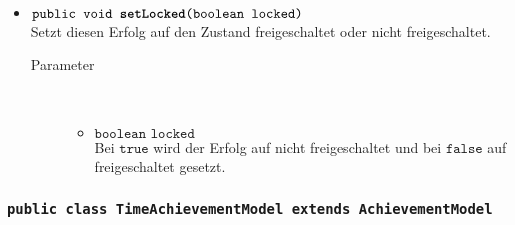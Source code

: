 \begin{description}
\begin{itemize}
	\item $\texttt{public void \textbf{setLocked}(boolean locked)}$ \\ Setzt diesen Erfolg auf den Zustand freigeschaltet oder nicht freigeschaltet.
		\begin{description}
			\item[Parameter] \hfill \\
			\vspace{-.8cm}
			\begin{itemize}
				\item $\texttt{boolean locked}$ \\ Bei $\texttt{true}$ wird der Erfolg auf nicht freigeschaltet und bei $\texttt{false}$ auf freigeschaltet gesetzt.
			\end{itemize}
		\end{description}

	\end{itemize}
\end{description}

\subsubsection{\normalfont \texttt{public class \textbf{TimeAchievementModel} extends AchievementModel}}

